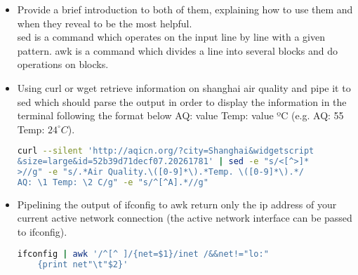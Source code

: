 \documentclass{article}
\begin{document}
\begin{itemize}
\item Provide a brief introduction to both of them, explaining how to use them and when they reveal to be the most helpful.\\
sed is a command which operates on the input line by line with a given pattern. awk is a command which divides a line into several blocks and do operations on blocks.

\item Using curl or wget retrieve information on shanghai air quality and pipe it to sed which should
parse the output in order to display the information in the terminal following the format below
AQ: value Temp: value ºC (e.g. AQ: 55 Temp: $24^{\circ}C$).
\begin{lstlisting}[language=bash]
curl --silent 'http://aqicn.org/?city=Shanghai&widgetscript
&size=large&id=52b39d71decf07.20261781' | sed -e "s/<[^>]*
>//g" -e "s/.*Air Quality.\([0-9]*\).*Temp. \([0-9]*\).*/
AQ: \1 Temp: \2 C/g" -e "s/^[^A].*//g"
\end{lstlisting}

\item Pipelining the output of ifconfig to awk return only the ip address of your current active network connection (the active network interface can be passed to ifconfig).

\begin{lstlisting}[language=bash]
    ifconfig | awk '/^[^ ]/{net=$1}/inet /&&net!="lo:"
    {print net"\t"$2}'
\end{lstlisting}
\end{itemize}
\end{document}
